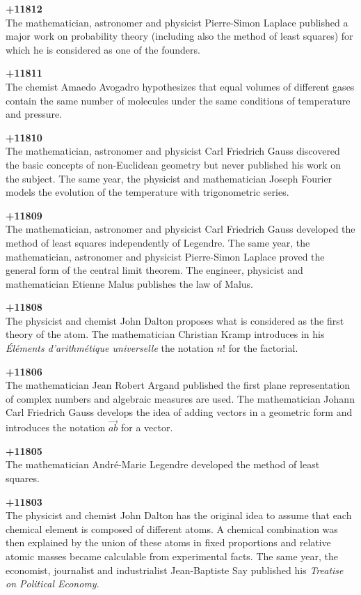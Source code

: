 \textbf{+11812}\\
The mathematician, astronomer and physicist Pierre-Simon Laplace published a major work on probability theory (including also the method of least squares) for which he is considered as one of the founders.

\textbf{+11811}\\
The chemist Amaedo Avogadro hypothesizes that equal volumes of different gases contain the same number of molecules under the same conditions of temperature and pressure.

\textbf{+11810}\\
The mathematician, astronomer and physicist Carl Friedrich Gauss discovered the basic concepts of non-Euclidean geometry but never published his work on the subject. The same year, the physicist and mathematician Joseph Fourier models the evolution of the temperature with trigonometric series.

\textbf{+11809}\\
The mathematician, astronomer and physicist Carl Friedrich Gauss developed the method of least squares independently of Legendre. The same year, the mathematician, astronomer and physicist Pierre-Simon Laplace proved the general form of the central limit theorem. The engineer, physicist and mathematician Etienne Malus publishes the law of Malus.

\textbf{+11808}\\
The physicist and chemist John Dalton proposes what is considered as the first theory of the atom. The mathematician Christian Kramp introduces in his \textit{Éléments d'arithmétique universelle} the notation $n!$ for the factorial.

\textbf{+11806}\\
The mathematician Jean Robert Argand published the first plane representation of complex numbers and algebraic measures are used. The mathematician Johann Carl Friedrich Gauss develops the idea of adding vectors in a geometric form and introduces the notation $\overrightarrow{ab}$ for a vector.

\textbf{+11805}\\
The mathematician André-Marie Legendre developed the method of least squares.

\textbf{+11803}\\
The physicist and chemist John Dalton has the original idea to assume that each chemical element is composed of different atoms. A chemical combination was then explained by the union of these atoms in fixed proportions and relative atomic masses became calculable from experimental facts. The same year, the economist, journalist and industrialist Jean-Baptiste Say published his \textit{Treatise on Political Economy}.

